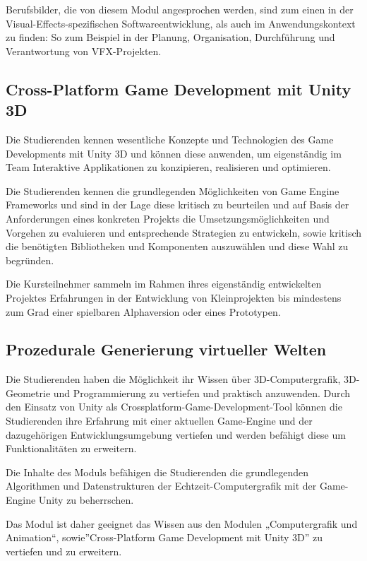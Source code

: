 Berufsbilder, die von diesem Modul angesprochen werden, sind zum einen
in der Visual-Effects-spezifischen Softwareentwicklung, als auch im
Anwendungskontext zu finden: So zum Beispiel in der Planung,
Organisation, Durchführung und Verantwortung von VFX-Projekten.

\subsection*{Cross-Platform Game Development mit Unity
3D}\label{cross-platform-game-development-mit-unity-3d}

Die Studierenden kennen wesentliche Konzepte und Technologien des Game
Developments mit Unity 3D und können diese anwenden, um eigenständig im
Team Interaktive Applikationen zu konzipieren, realisieren und
optimieren.

Die Studierenden kennen die grundlegenden Möglichkeiten von Game Engine
Frameworks und sind in der Lage diese kritisch zu beurteilen und auf
Basis der Anforderungen eines konkreten Projekts die
Umsetzungsmöglichkeiten und Vorgehen zu evaluieren und entsprechende
Strategien zu entwickeln, sowie kritisch die benötigten Bibliotheken und
Komponenten auszuwählen und diese Wahl zu begründen.

Die Kursteilnehmer sammeln im Rahmen ihres eigenständig entwickelten
Projektes Erfahrungen in der Entwicklung von Kleinprojekten bis
mindestens zum Grad einer spielbaren Alphaversion oder eines Prototypen.

\subsection*{Prozedurale Generierung virtueller
Welten}\label{prozedurale-generierung-virtueller-welten}

Die Studierenden haben die Möglichkeit ihr Wissen über
3D-Computergrafik, 3D-Geometrie und Programmierung zu vertiefen und
praktisch anzuwenden. Durch den Einsatz von Unity als
Crossplatform-Game-Development-Tool können die Studierenden ihre
Erfahrung mit einer aktuellen Game-Engine und der dazugehörigen
Entwicklungsumgebung vertiefen und werden befähigt diese um
Funktionalitäten zu erweitern.

Die Inhalte des Moduls befähigen die Studierenden die grundlegenden
Algorithmen und Datenstrukturen der Echtzeit-Computergrafik mit der
Game-Engine Unity zu beherrschen.

Das Modul ist daher geeignet das Wissen aus den Modulen „Computergrafik
und Animation``, sowie''Cross-Platform Game Development mit Unity 3D''
zu vertiefen und zu erweitern.

